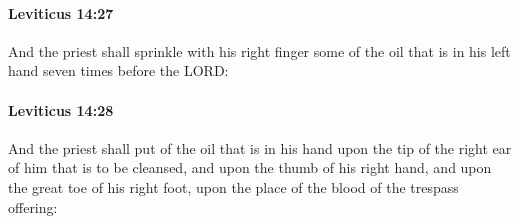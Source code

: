 		\paragraph{Leviticus 14:27} %
			\label{LEVITICUS-14-27}

			And the priest shall sprinkle with his right finger some of the oil that is in his left hand seven times before the LORD:


		\paragraph{Leviticus 14:28} %
			\label{LEVITICUS-14-28}

			And the priest shall put of the oil that is in his hand upon the tip of the right ear of him that is to be cleansed, and upon the thumb of his right hand, and upon the great toe of his right foot, upon the place of the blood of the trespass offering:

